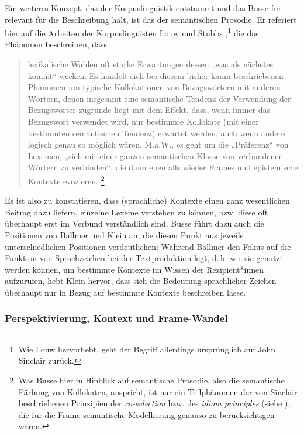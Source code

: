Ein weiteres Konzept, das der Korpuslinguistik entstammt und das Busse für relevant für die Beschreibung hält, ist das der semantischen Prosodie. Er referiert hier auf die Arbeiten der Korpuslinguisten Louw \autocite*{louwIronyTextInsincerity1993} und Stubbs \autocite*{stubbsTextCorpusAnalysis1996},\footnote{Wie Louw \autocite*[31-32]{louwIronyTextInsincerity1993} hervorhebt, geht der Begriff allerdings ursprünglich auf John Sinclair zurück.} die das Phänomen beschreiben, dass

\begin{quote}
lexikalische Wahlen oft starke Erwartungen dessen „was als nächstes kommt`` wecken. Es handelt sich bei diesem bisher kaum beschriebenen Phänomen um typische Kollokationen von Bezugswörtern mit anderen Wörtern, denen insgesamt eine semantische Tendenz der Verwendung der Bezugswörter zugrunde liegt mit dem Effekt, dass, wenn immer das Bezugswort verwendet wird, nur bestimmte Kollokate (mit einer bestimmten semantischen Tendenz) erwartet werden, auch wenn andere logisch genau so möglich wären. M.a.W., es geht um die „Präferenz`` von Lexemen, „sich mit einer ganzen semantischen Klasse von verbundenen Wörtern zu verbinden``, die dann ebenfalls wieder Frames und epistemische Kontexte evozieren. \autocite[655]{busseFrameSemantikKompendium2012}\footnote{Was Busse hier in Hinblick auf semantische Prosodie, also die semantische Färbung von Kollokaten, anspricht, ist nur ein Teilphänomen der von Sinclair beschriebenen Prinzipien der \emph{co-selection} bzw. des \emph{idiom principles} (siehe ), die für die Frame-semantische Modellierung genauso zu berücksichtigen wären.}
\end{quote}

Es ist also zu konstatieren, dass (sprachliche) Kontexte einen ganz wesentlichen Beitrag dazu liefern, einzelne Lexeme verstehen zu können, bzw. diese oft überhaupt erst im Verbund verständlich sind. Busse führt dazu auch die Positionen von Ballmer und Klein an, die diesen Punkt aus jeweils unterschiedlichen Positionen verdeutlichen: Während Ballmer den Fokus auf die Funktion von Sprachzeichen bei der Textproduktion legt, d.\,h. wie sie genutzt werden können, um bestimmte Kontexte im Wissen der Rezipient*innen aufzurufen, hebt Klein hervor, dass sich die Bedeutung sprachlicher Zeichen überhaupt nur in Bezug auf bestimmte Kontexte beschreiben lasse.

\subsubsection{Perspektivierung, Kontext und Frame-Wandel}\label{perspektivierung-kontext-und-frame-wandel}

